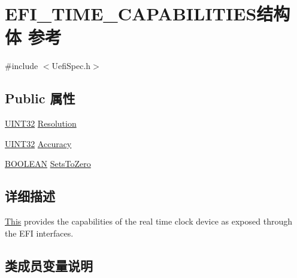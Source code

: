 \hypertarget{struct_e_f_i___t_i_m_e___c_a_p_a_b_i_l_i_t_i_e_s}{}\section{E\+F\+I\+\_\+\+T\+I\+M\+E\+\_\+\+C\+A\+P\+A\+B\+I\+L\+I\+T\+I\+E\+S结构体 参考}
\label{struct_e_f_i___t_i_m_e___c_a_p_a_b_i_l_i_t_i_e_s}


{\ttfamily \#include $<$Uefi\+Spec.\+h$>$}

\subsection*{Public 属性}
\begin{DoxyCompactItemize}
\item 
\hyperlink{_processor_bind_8h_ae1e6edbbc26d6fbc71a90190d0266018}{U\+I\+N\+T32} \hyperlink{struct_e_f_i___t_i_m_e___c_a_p_a_b_i_l_i_t_i_e_s_a5e302cf166017eacf05df9de37f09338}{Resolution}
\item 
\hyperlink{_processor_bind_8h_ae1e6edbbc26d6fbc71a90190d0266018}{U\+I\+N\+T32} \hyperlink{struct_e_f_i___t_i_m_e___c_a_p_a_b_i_l_i_t_i_e_s_aa0b470bb2621aad93ca9d510b0c2571e}{Accuracy}
\item 
\hyperlink{_processor_bind_8h_a112e3146cb38b6ee95e64d85842e380a}{B\+O\+O\+L\+E\+AN} \hyperlink{struct_e_f_i___t_i_m_e___c_a_p_a_b_i_l_i_t_i_e_s_ab2dce3f0b8c903fb192b57d2b9b3df47}{Sets\+To\+Zero}
\end{DoxyCompactItemize}


\subsection{详细描述}
\hyperlink{namespace_this}{This} provides the capabilities of the real time clock device as exposed through the E\+FI interfaces. 

\subsection{类成员变量说明}
\mbox{\label{struct_e_f_i___t_i_m_e___c_a_p_a_b_i_l_i_t_i_e_s_aa0b470bb2621aad93ca9d510b0c2571e}} 
